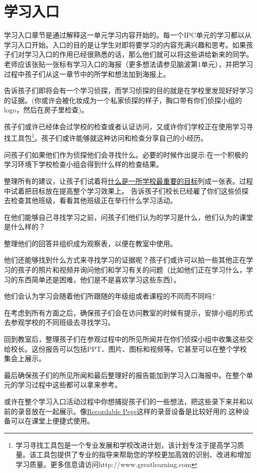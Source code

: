 \chapter{学习入口}
   学习入口章节是通过解释这一单元学习内容开始的。每一个IPC单元的学习都以从学习入口开始。入口的目的是让学生对即将要学习的内容充满兴趣和思考。如果孩子们对学习入口的作用已经很熟悉的话，那么他们就可以将这些讲给新来的同学。老师应该张贴一张标有学习入口的海报（更多想法请参见脑波第1单元），并把学习过程中孩子们从这一章节中的所学和想法加到海报上。 \par
   告诉孩子们即将会有一个学习侦探，而学习侦探的目的就是在学校里发现好好学习的证据。(你或许会被化妆成为一个私家侦探的样子，胸口带有你们侦探小组的logo，然后在房子里检查)。  \par
   孩子们或许已经体会过学校的检查或者认证访问，又或许你们学校正在使用学习寻找工具包\footnote{学习寻找工具包是一个专业发展和学校改进计划，该计划专注于提高学习质量。该工具包提供了专业的指导来帮助您的学校更加高效的识别、改进和增加学习质量。更多信息请访问http://www.greatlearning.com}。孩子们或许能够就这种访问和检查分享自己的小经历。  \par
   问孩子们如果他们作为侦探他们会寻找什么。必要的时候作出提示:在一个积极的学习环境下学校检查小组会得到什么样的检查结果。   \par
   整理所有的建议，让孩子们试着将\underline{什么是一所学校最重要的目标}列成一张表。过程中试着把目标放在提高整个学习效果上。
   告诉孩子们校长已经雇了你们这些侦探去检查其他班级，看看其他班级正在举行什么学习活动。   \par
   在他们能够自己寻找学习之前，问孩子们他们认为的学习是什么，他们认为的课堂是什么样的？\par
   整理他们的回答并组织成为观察表，以便在教室中使用。  \par
   他们还能够找到什么方式来寻找学习的证据呢？孩子们或许可以拍一些其他正在学习的孩子的照片和视频并询问他们和学习有关的问题（比如他们正在学习什么，学习的东西简单还是困难，他们是不是喜欢学习这些东西）。\par
   他们会认为学习会随着他们所跟随的年级组或者课程的不同而不同吗?  \par
   在考虑到所有方面之后，确保孩子们会在访问教室的时候有提示，安排小组的形式去参观学校的不同班级去寻找学习。\par
   回到教室后，整理孩子们在参观过程中的所见所闻并在你们侦探小组中收集这些交给校长。这份报告可以包括PPT、图片、图标和视频等。它甚至可以在整个学校集会上展示。\par
   最后确保孩子们的所见所闻和最后整理好的报告能加到学习入口海报中。在整个单元的学习过程中这些都可以拿来参考。 \par
   或许在整个学习入口活动过程中你想捕捉孩子们的一些想法，把这些录下来并和以前的录音放在一起展示。像\href{http://www.tts-group.co.uk/shops/tts/Products/PD1838921/Recordable-Pegs/}{Recordable Pegs}这样的录音设备是比较好用的.这种设备可以在课堂上便捷式使用。\par

   
   
   
   

